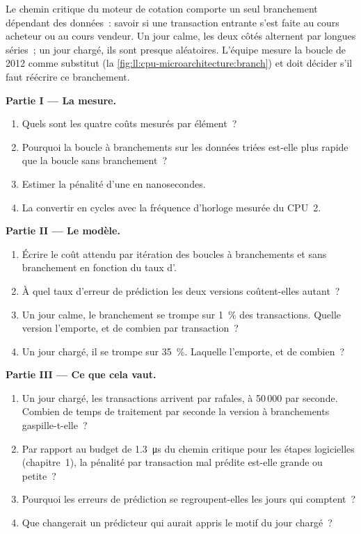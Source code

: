 \begin{problem}\label{pb:ll:cpu-microarchitecture:1}
Le chemin critique du moteur de cotation comporte un seul branchement dépendant des données~: savoir si une transaction entrante s'est faite au cours acheteur ou au cours vendeur.
Un jour calme, les deux côtés alternent par longues séries~; un jour chargé, ils sont presque aléatoires. L'équipe mesure la boucle de 2012 comme
substitut (la \cref{fig:ll:cpu-microarchitecture:branch}) et doit décider s'il faut réécrire ce branchement.

\medskip\noindent\textbf{Partie I --- La mesure.}
\begin{enumerate}
\item Quels sont les quatre coûts mesurés par élément~?
\item Pourquoi la boucle à branchements sur les données triées est-elle plus rapide que la boucle sans branchement~?
\item Estimer la pénalité d'une  en nanosecondes.
\item La convertir en cycles avec la fréquence d'horloge mesurée du CPU~2.
\end{enumerate}

\medskip\noindent\textbf{Partie II --- Le modèle.}
\begin{enumerate}[resume]
\item Écrire le coût attendu par itération des boucles à branchements et sans branchement en fonction du
taux d'.
\item À quel taux d'erreur de prédiction les deux versions coûtent-elles autant~?
\item Un jour calme, le branchement se trompe sur 1~\% des transactions. Quelle version l'emporte, et de combien par transaction~?
\item Un jour chargé, il se trompe sur 35~\%. Laquelle l'emporte, et de combien~?
\end{enumerate}

\medskip\noindent\textbf{Partie III --- Ce que cela vaut.}
\begin{enumerate}[resume]
\item Un jour chargé, les transactions arrivent par rafales, à 50\,000 par seconde. Combien de temps de traitement
par seconde la version à branchements gaspille-t-elle~?
\item Par rapport au budget de \qty{1.3}{\micro\second} du chemin critique pour les étapes logicielles (chapitre~1), la pénalité par
transaction mal prédite est-elle grande ou petite~?
\item Pourquoi les erreurs de prédiction se regroupent-elles les jours qui comptent~?
\item Que changerait un prédicteur qui aurait appris le motif du jour chargé~?
\end{enumerate}


\end{problem}
